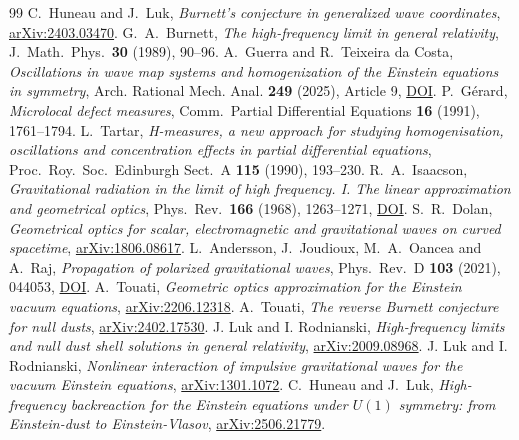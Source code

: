 \documentclass[11pt]{article}
\begin{document}
\begin{thebibliography}{99}
 C.~Huneau and J.~Luk, \emph{Burnett's conjecture in generalized wave coordinates}, \href{https://arxiv.org/abs/2403.03470}{arXiv:2403.03470}.
 G.~A.~Burnett, \emph{The high-frequency limit in general relativity}, J.\ Math.\ Phys.\ \textbf{30} (1989), 90--96.
 A.~Guerra and R.~Teixeira da Costa, \emph{Oscillations in wave map systems and homogenization of the Einstein equations in symmetry}, Arch. Rational Mech. Anal. \textbf{249} (2025), Article 9, \href{https://doi.org/10.1007/s00205-024-02042-3}{DOI}.
 P.~G\'erard, \emph{Microlocal defect measures}, Comm.\ Partial Differential Equations \textbf{16} (1991), 1761--1794.
 L.~Tartar, \emph{H-measures, a new approach for studying homogenisation, oscillations and concentration effects in partial differential equations}, Proc.\ Roy.\ Soc.\ Edinburgh Sect.\ A \textbf{115} (1990), 193--230.
 R.~A.~Isaacson, \emph{Gravitational radiation in the limit of high frequency. I. The linear approximation and geometrical optics}, Phys.\ Rev.\ \textbf{166} (1968), 1263--1271, \href{https://doi.org/10.1103/PhysRev.166.1263}{DOI}.
 S.~R.~Dolan, \emph{Geometrical optics for scalar, electromagnetic and gravitational waves on curved spacetime}, \href{https://arxiv.org/abs/1806.08617}{arXiv:1806.08617}.
 L.~Andersson, J.~Joudioux, M.~A.~Oancea and A.~Raj, \emph{Propagation of polarized gravitational waves}, Phys.\ Rev.\ D \textbf{103} (2021), 044053, \href{https://doi.org/10.1103/PhysRevD.103.044053}{DOI}.
 A.~Touati, \emph{Geometric optics approximation for the Einstein vacuum equations}, \href{https://arxiv.org/abs/2206.12318}{arXiv:2206.12318}.
 A.~Touati, \emph{The reverse Burnett conjecture for null dusts}, \href{https://arxiv.org/abs/2402.17530}{arXiv:2402.17530}.
 J. Luk and I. Rodnianski, \emph{High-frequency limits and null dust shell solutions in general relativity}, \href{https://arxiv.org/abs/2009.08968}{arXiv:2009.08968}.
 J. Luk and I. Rodnianski, \emph{Nonlinear interaction of impulsive gravitational waves for the vacuum Einstein equations}, \href{https://arxiv.org/abs/1301.1072}{arXiv:1301.1072}.
 C.~Huneau and J.~Luk, \emph{High-frequency backreaction for the Einstein equations under $U(1)$ symmetry: from Einstein-dust to Einstein-Vlasov}, \href{https://arxiv.org/abs/2506.21779}{arXiv:2506.21779}.
\end{thebibliography}
\end{document}
